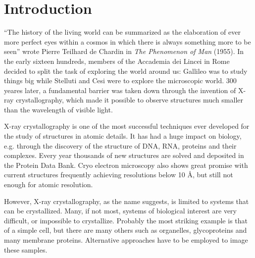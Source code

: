 \chapter{Introduction}\label{introduction}\noindent

``The history of the living world can be summarized as the elaboration of ever
more perfect eyes within a cosmos in which there is always something more to be
seen'' wrote Pierre Teilhard de Chardin in {\em The Phenomenon of Man} (1955). In the
early sixteen hundreds, members of the Accademia dei Lincei in Rome decided to
split the task of exploring the world around us: Gallileo was to study things
big while Stelluti and Cesi were to explore the microscopic world. 300 yeares
later, a fundamental barrier was taken down through the invention of X-ray
crystallography, which made it possible to observe structures much smaller than
the wavelength of visible light.

X-ray crystallography is one of the most successful techniques ever developed
for the study of structures in atomic details. It has had a huge impact on
biology, e.g. through the discovery of the structure of DNA, RNA, proteins
and their complexes. Every year thousands of new structures are solved and
deposited in the Protein Data Bank. Cryo electron microscopy also shows great
promise with current structures frequently achieving resolutions below 10 \AA,
but still not enough for atomic resolution. 



However, X-ray crystallography, as the name suggests, is limited to systems that
can be crystallized. Many, if not most, systems of biological interest are very
difficult, or impossible to crystallize. Probably the most striking example is
that of a simple cell, but there are many others such as organelles, glycoproteins and many
membrane proteins. Alternative approaches have to be employed to image these
samples.

